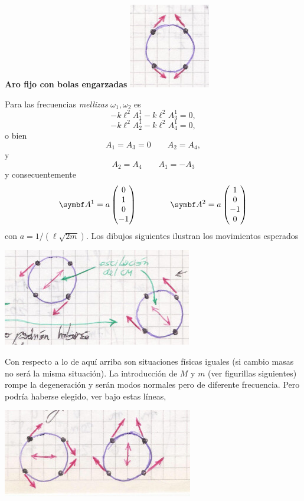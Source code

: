 \documentclass[10pt,oneside]{CBFT_book}
\begin{document}
\begin{ejemplo}{\bf Aro fijo con bolas engarzadas}
\includegraphics[scale=0.5]{images/fig_mc_problema_aro_modos_normales_3.jpg} 

Para las frecuencias {\it mellizas} $\omega_1,\omega_2 $ es 
\[
	- k \ell^2 A_1^1 - k \ell^2 A_3^1 = 0,
\]
\[
	- k \ell^2 A_2^1 - k \ell^2 A_4^1 = 0,
\]
o bien 
\[
	A_1 = A_3 = 0 \qquad A_2 = A_4,
\]
y
\[
	A_2 = A_4 \qquad A_1 = -A_3
\]
y consecuentemente 
\[
	\vb{A}^1 = a \begin{pmatrix}
	              0 \\
	              1 \\
	              0 \\
	              -1 
	             \end{pmatrix} 
	             \qquad \qquad 
	\vb{A}^2 = a \begin{pmatrix}
	              1 \\
	              0 \\
	              -1 \\
	              0 
	             \end{pmatrix} 
\]
con $ a = 1 /(\ell\sqrt{2m})$. Los dibujos siguientes ilustran los movimientos esperados

\includegraphics[scale=0.5]{images/fig_mc_problema_aro_modos_normales_4.jpg} 

Con respecto a lo de aquí arriba son situaciones físicas iguales (si cambio masas no será la misma situación).
La introducción de $M$ y $m$ (ver figurillas siguientes) rompe la degeneración y serán modos normales pero de diferente 
frecuencia.
Pero podría haberse elegido, ver bajo estas líneas,

\includegraphics[scale=0.5]{images/fig_mc_problema_aro_modos_normales_5.jpg} 


\end{ejemplo}
\end{document}
